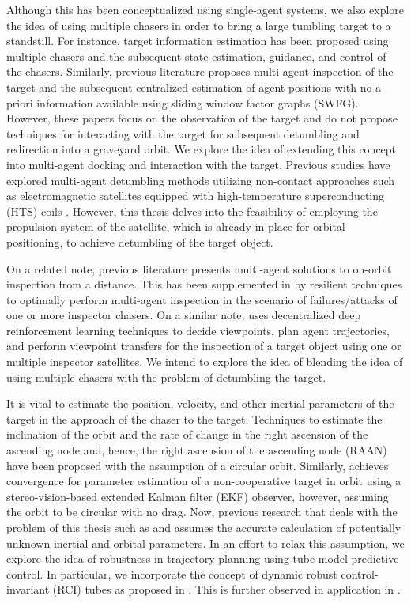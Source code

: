 Although this has been conceptualized using single-agent systems, we also explore the idea of using multiple chasers in order to bring a large tumbling target to a standstill.
For instance, target information estimation has been proposed \cite{nakka2022information} using multiple chasers and the subsequent state estimation, guidance, and control of the chasers.
Similarly, previous literature \cite{mercier2023relative} proposes multi-agent inspection of the target and the subsequent centralized estimation of agent positions with no a priori information available using sliding window factor graphs (SWFG).
However, these papers focus on the observation of the target and do not propose techniques for interacting with the target for subsequent detumbling and redirection into a graveyard orbit.
We explore the idea of extending this concept into multi-agent docking and interaction with the target.
Previous studies have explored multi-agent detumbling methods utilizing non-contact approaches such as electromagnetic satellites equipped with high-temperature superconducting (HTS) coils \cite{yu2021prospects}.
However, this thesis delves into the feasibility of employing the propulsion system of the satellite, which is already in place for orbital positioning, to achieve detumbling of the target object.

On a related note, previous literature \cite{nakka2022information} presents multi-agent solutions to on-orbit inspection from a distance.
This has been supplemented in \cite{choi2023resilient} by resilient techniques to optimally perform multi-agent inspection in the scenario of failures/attacks of one or more inspector chasers.
On a similar note, \cite{aurand2023exposure} uses decentralized deep reinforcement learning techniques to decide viewpoints, plan agent trajectories, and perform viewpoint transfers for the inspection of a target object using one or multiple inspector satellites.
We intend to explore the idea of blending the idea of using multiple chasers with the problem of detumbling the target.

It is vital to estimate the position, velocity, and other inertial parameters of the target in the approach of the chaser to the target.
Techniques to estimate the inclination of the orbit and the rate of change in the right ascension of the ascending node and, hence, the right ascension of the ascending node (RAAN) have been proposed \cite{hanada2022estimation} with the assumption of a circular orbit.
Similarly, \cite{ge2020motion} achieves convergence for parameter estimation of a non-cooperative target in orbit using a stereo-vision-based extended Kalman filter (EKF) observer, however, assuming the orbit to be circular with no drag.
Now, previous research that deals with the problem of this thesis such as \cite{albee2021robust} and \cite{starek2017fast} assumes the accurate calculation of potentially unknown inertial and orbital parameters.
In an effort to relax this assumption, we explore the idea of robustness in trajectory planning using tube model predictive control.
In particular, we incorporate the concept of dynamic robust control-invariant (RCI) tubes as proposed in \cite{brett2019dynamic}.
This is further observed in application in \cite{specht2023autonomous}.

